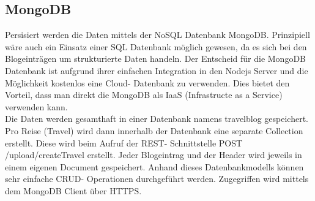 \documentclass[../main.tex]{subfiles}
\begin{document}
\subsection{MongoDB}
Persisiert werden die Daten mittels der NoSQL Datenbank MongoDB. Prinzipiell wäre auch ein Einsatz einer SQL Datenbank möglich gewesen, da es sich bei den Blogeinträgen um strukturierte Daten handeln. Der Entscheid für die MongoDB Datenbank ist aufgrund ihrer einfachen Integration in den Nodejs Server und die Möglichkeit kostenlos eine Cloud- Datenbank zu verwenden. Dies bietet den Vorteil, dass man direkt die MongoDB als IaaS (Infrastructe as a Service) verwenden kann.\\
Die Daten werden gesamthaft in einer Datenbank namens travelblog gespeichert. Pro Reise (Travel) wird dann innerhalb der Datenbank eine separate Collection erstellt. Diese wird beim Aufruf der REST- Schnittstelle POST /upload/createTravel erstellt. Jeder Blogeintrag und der Header wird jeweils in einem eigenen Document gespeichert. Anhand dieses Datenbankmodells können sehr einfache CRUD- Operationen durchgeführt werden. Zugegriffen wird mittels dem MongoDB Client über HTTPS.
\end{document}
